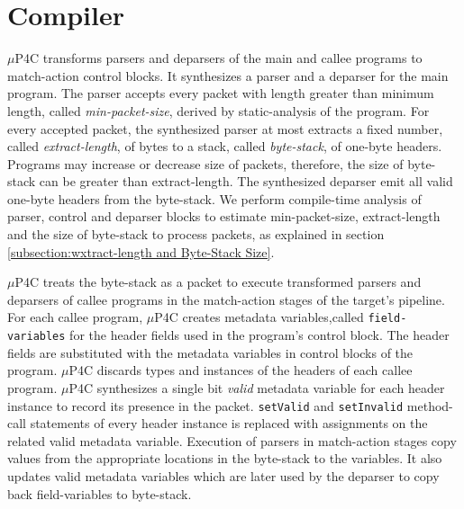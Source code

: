 \section{Compiler}
$\mu$P4C transforms parsers and deparsers of the main and callee programs to match-action control blocks.
It synthesizes a parser and a deparser for the main program.
The parser accepts every packet with length greater than minimum length, called \emph{min-packet-size}, derived by static-analysis of the program.
For every accepted packet, the synthesized parser at most extracts a fixed number, called \emph{extract-length}, of bytes to a stack, called \emph{byte-stack}, of one-byte headers.
Programs may increase or decrease size of packets, therefore, the size of byte-stack can be greater than extract-length.
The synthesized deparser emit all valid one-byte headers from the byte-stack.
We perform compile-time analysis of parser, control and deparser blocks to estimate min-packet-size, extract-length and the size of byte-stack to process packets, as explained in section \ref{subsection:wxtract-length and Byte-Stack Size}. 


$\mu$P4C treats the byte-stack as a packet to execute transformed parsers and deparsers of callee programs in the match-action stages of the target's pipeline.
For each callee program, $\mu$P4C creates metadata variables,called \texttt{field-variables} for the header fields used in the program's control block.
The header fields are substituted with the metadata variables in control blocks of the program.
$\mu$P4C discards types and instances of the headers of each callee program.
$\mu$P4C synthesizes a single bit \emph{valid} metadata variable for each header instance to record its presence in the packet.
\texttt{setValid} and \texttt{setInvalid} method-call statements of every header instance is replaced with assignments on the related valid metadata variable.
Execution of parsers in match-action stages copy values from the appropriate locations in the byte-stack to the variables.
It also updates valid metadata variables which are later used by the deparser to copy back field-variables to byte-stack.



